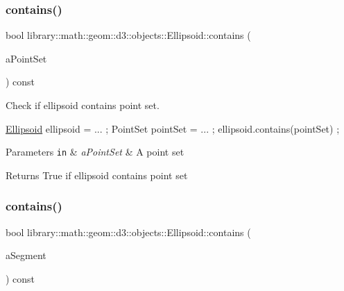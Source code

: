 \subsubsection{\texorpdfstring{contains()}{contains()}\hspace{0.1cm}{\footnotesize\ttfamily [2/3]}}
{\footnotesize\ttfamily bool library\+::math\+::geom\+::d3\+::objects\+::\+Ellipsoid\+::contains (\begin{DoxyParamCaption}\item[{const \hyperlink{classlibrary_1_1math_1_1geom_1_1d3_1_1objects_1_1_point_set}{Point\+Set} \&}]{a\+Point\+Set }\end{DoxyParamCaption}) const}



Check if ellipsoid contains point set. 


\begin{DoxyCode}
\hyperlink{classlibrary_1_1math_1_1geom_1_1d3_1_1objects_1_1_ellipsoid_aae81fe0edc7f0e8d4590ea89ae73cb14}{Ellipsoid} ellipsoid = ... ;
PointSet pointSet = ... ;
ellipsoid.contains(pointSet) ;
\end{DoxyCode}



\begin{DoxyParams}[1]{Parameters}
\mbox{\tt in}  & {\em a\+Point\+Set} & A point set \\
\hline
\end{DoxyParams}
\begin{DoxyReturn}{Returns}
True if ellipsoid contains point set 
\end{DoxyReturn}
\mbox{\label{classlibrary_1_1math_1_1geom_1_1d3_1_1objects_1_1_ellipsoid_a4b0c41a41fbd8f158da26825f04c47d5}} 
\subsubsection{\texorpdfstring{contains()}{contains()}\hspace{0.1cm}{\footnotesize\ttfamily [3/3]}}
{\footnotesize\ttfamily bool library\+::math\+::geom\+::d3\+::objects\+::\+Ellipsoid\+::contains (\begin{DoxyParamCaption}\item[{const \hyperlink{classlibrary_1_1math_1_1geom_1_1d3_1_1objects_1_1_segment}{Segment} \&}]{a\+Segment }\end{DoxyParamCaption}) const}



